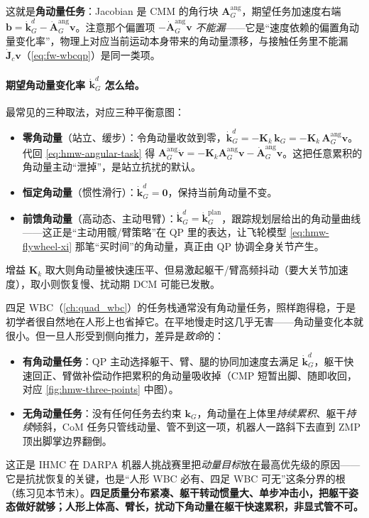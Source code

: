这就是\textbf{角动量任务}：Jacobian 是 CMM 的角行块 $\mathbf A_G^{\mathrm{ang}}$，期望任务加速度右端 $\mathbf b=\dot{\mathbf k}_G^{d}-\dot{\mathbf A}_G^{\mathrm{ang}}\mathbf v$。注意那个偏置项 $-\dot{\mathbf A}_G^{\mathrm{ang}}\mathbf v$ \emph{不能漏}——它是“速度依赖的偏置角动量变化率”，物理上对应当前运动本身带来的角动量漂移，与接触任务里不能漏 $\dot{\mathbf J}_c\mathbf v$（\cref{eq:fw-wbcqp}）是同一类项。

\paragraph{期望角动量变化率 $\dot{\mathbf k}_G^d$ 怎么给。}
最常见的三种取法，对应三种平衡意图：
\begin{itemize}
  \item \textbf{零角动量}（站立、缓步）：令角动量收敛到零，$\dot{\mathbf k}_G^d=-\mathbf K_k\,\mathbf k_G=-\mathbf K_k\,\mathbf A_G^{\mathrm{ang}}\mathbf v$。代回 \cref{eq:hmw-angular-task} 得 $\mathbf A_G^{\mathrm{ang}}\dot{\mathbf v}=-\mathbf K_k\mathbf A_G^{\mathrm{ang}}\mathbf v-\dot{\mathbf A}_G^{\mathrm{ang}}\mathbf v$。这把任意累积的角动量主动“泄掉”，是站立抗扰的默认。
  \item \textbf{恒定角动量}（惯性滑行）：$\dot{\mathbf k}_G^d=\mathbf 0$，保持当前角动量不变。
  \item \textbf{前馈角动量}（高动态、主动甩臂）：$\dot{\mathbf k}_G^d=\dot{\mathbf k}_G^{\mathrm{plan}}$，跟踪规划层给出的角动量曲线——这正是“主动用髋/臂策略”在 QP 里的表达，让飞轮模型 \cref{eq:hmw-flywheel-xi} 那笔“买时间”的角动量，真正由 QP 协调全身关节产生。
\end{itemize}
增益 $\mathbf K_k$ 取大则角动量被快速压平、但易激起躯干/臂高频抖动（要大关节加速度），取小则恢复慢、扰动期 DCM 可能已发散。

\begin{insight}\label{ins:hmw-no-momentum-task}
四足 WBC（\cref{ch:quad_wbc}）的任务栈通常没有角动量任务，照样跑得稳，于是初学者很自然地在人形上也省掉它。在平地慢走时这几乎无害——角动量变化本就很小。但一旦人形受到侧向推力，差异是\emph{致命}的：
\begin{itemize}
  \item \textbf{有角动量任务}：QP 主动选择躯干、臂、腿的协同加速度去满足 $\dot{\mathbf k}_G^d$，躯干快速回正、臂做补偿动作把累积的角动量吸收掉（CMP 短暂出脚、随即收回，对应 \cref{fig:hmw-three-points} 中图）。
  \item \textbf{无角动量任务}：没有任何任务去约束 $\mathbf k_G$，角动量在上体里\emph{持续累积}、躯干\emph{持续}倾斜，CoM 任务只管线动量、管不到这一项，机器人一路斜下去直到 ZMP 顶出脚掌边界翻倒。
\end{itemize}
这正是 IHMC 在 DARPA 机器人挑战赛里把\emph{动量目标}放在最高优先级的原因——它是抗扰恢复的关键，也是“人形 WBC 必有、四足 WBC 可无”这条分界的根（练习见本节末）。\textbf{四足质量分布紧凑、躯干转动惯量大、单步冲击小，把躯干姿态做好就够；人形上体高、臂长，扰动下角动量在躯干快速累积，非显式管不可。}
\end{insight}

